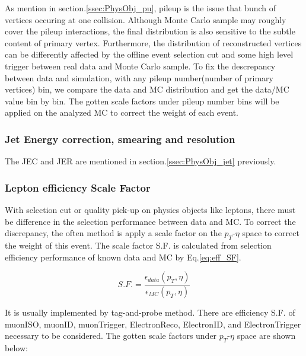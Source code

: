 
			As mention in section.\ref{ssec:PhysObj_pu}, pileup is the issue that bunch of vertices occuring at one collision. Although Monte Carlo sample may roughly cover the pileup interactions, the final distribution is also sensitive to the subtle content of primary vertex. Furthermore, the distribution of reconstructed vertices can be differently affected by the offline event selection cut and some high level trigger between real data and Monte Carlo sample. To fix the descrepancy between data and simulation, with any pileup number(number of primary vertices) bin, we compare the data and MC distribution and get the data/MC value bin by bin. The gotten scale factors under pileup number bins will be applied on the analyzed MC to correct the weight of each event.

		\subsubsection{Jet Energy correction, smearing and resolution}
		\label{sssec:DataAndMC_JE_CSR}

			The JEC and JER are mentioned in section.\ref{ssec:PhysObj_jet} previously.

		\subsubsection{Lepton efficiency Scale Factor}
		\label{sssec:DataAndMC_LepEffSF}

		With selection cut or quality pick-up on physics objects like leptons, there must be difference in the selection performance between data and MC. To correct the discrepancy, the often method is apply a scale factor on the $p_T$-$\eta$ space to correct the weight of this event. The scale factor S.F. is calculated from selection efficiency performance of known data and MC by Eq.\ref{eq:eff_SF}. 

		\begin{equation}
		S.F. = \frac{\epsilon_{data}(p_T,\eta)}{\epsilon_{MC}(p_T,\eta)}
		\label{eq:eff_SF}
		\end{equation}

		It is usually implemented by tag-and-probe method\cite{tagandprobe_twiki}. There are efficiency S.F. of muonISO, muonID, muonTrigger, ElectronReco, ElectronID, and ElectronTrigger necessary to be considered. The gotten scale factors under $p_T$-$\eta$ space are shown below:

